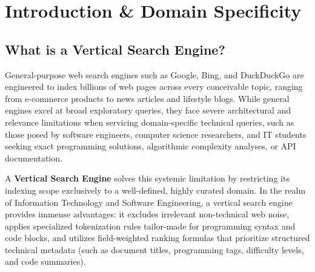 \documentclass[12pt,a4paper]{article}
\begin{document}
\tableofcontents
\newpage

\section{Introduction \& Domain Specificity}

\subsection{What is a Vertical Search Engine?}
General-purpose web search engines such as Google, Bing, and DuckDuckGo are engineered to index billions of web pages across every conceivable topic, ranging from e-commerce products to news articles and lifestyle blogs. While general engines excel at broad exploratory queries, they face severe architectural and relevance limitations when servicing domain-specific technical queries, such as those posed by software engineers, computer science researchers, and IT students seeking exact programming solutions, algorithmic complexity analyses, or API documentation.

A \textbf{Vertical Search Engine} solves this systemic limitation by restricting its indexing scope exclusively to a well-defined, highly curated domain. In the realm of Information Technology and Software Engineering, a vertical search engine provides immense advantages: it excludes irrelevant non-technical web noise, applies specialized tokenization rules tailor-made for programming syntax and code blocks, and utilizes field-weighted ranking formulas that prioritize structured technical metadata (such as document titles, programming tags, difficulty levels, and code summaries).
\end{document}

